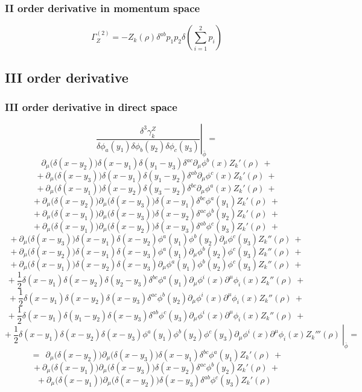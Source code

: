 \subsubsection{II order derivative in momentum space}
\begin{equation}\label{Z2}
 \Gamma_Z^{(2)} = - Z_k(\rho)\delta^{ab}p_1p_2  \delta\left(\sum_{i=1}^2 p_i\right)
\end{equation}


\subsection{III order derivative}
\subsubsection{III order derivative in direct space}
\begin{equation}
\left. \frac{\delta^3 \gamma_k^{Z}}{\delta \phi_a(y_1)\delta \phi_b(y_2)\delta \phi_c(y_3)}\right|_{\bar{\phi}} = 
\end{equation}
$$\partial_\mu\big(\delta(x-y_2)\big)\delta(x-y_1)\delta(y_1 - y_3)\delta^{ac}\partial_\mu\phi^b(x)Z_k'(\rho)\ + $$
$$+\ \partial_\mu\big(\delta(x-y_3)\big)\delta(x-y_1)\delta(y_1 - y_2)\delta^{ab}\partial_\mu\phi^c(x)Z_k'(\rho)\ + $$
$$+\ \partial_\mu\big(\delta(x-y_1)\big)\delta(x-y_2)\delta(y_3 - y_2)\delta^{bc}\partial_\mu\phi^a(x)Z_k'(\rho)\ + $$
$$+\ \partial_\mu\big(\delta(x-y_2)\big)\partial_\mu\big(\delta(x-y_3)\big)\delta(x - y_1)\delta^{bc}\phi^a(y_1)Z_k'(\rho)\ + $$
$$+\ \partial_\mu\big(\delta(x-y_1)\big)\partial_\mu\big(\delta(x-y_3)\big)\delta(x - y_2)\delta^{ac}\phi^b(y_2)Z_k'(\rho)\ + $$
$$+\ \partial_\mu\big(\delta(x-y_1)\big)\partial_\mu\big(\delta(x-y_2)\big)\delta(x - y_3)\delta^{ab}\phi^c(y_3)Z_k'(\rho)\ + $$
$$+\ \partial_\mu\big(\delta(x-y_3)\big)\delta(x-y_1)\delta(x - y_2)\phi^a(y_1)\phi^b(y_2)\partial_\mu\phi^c(y_3)Z_k''(\rho)\ + $$
$$+\ \partial_\mu\big(\delta(x-y_2)\big)\delta(x-y_1)\delta(x - y_3)\phi^a(y_1)\partial_\mu\phi^b(y_2)\phi^c(y_3)Z_k''(\rho)\ + $$
$$+\ \partial_\mu\big(\delta(x-y_1)\big)\delta(x-y_2)\delta(x - y_3)\partial_\mu\phi^a(y_1)\phi^b(y_2)\phi^c(y_3)Z_k''(\rho)\ + $$
$$+\ \frac{1}{2}\delta(x-y_1)\delta(x-y_2)\delta(y_2 - y_3)\delta^{bc}\phi^a(y_1)\partial_\mu\phi^i(x)\partial^\mu\phi_i(x)Z_k''(\rho)\ + $$
$$+\ \frac{1}{2}\delta(x-y_1)\delta(x-y_2)\delta(x - y_3)\delta^{ac}\phi^b(y_2)\partial_\mu\phi^i(x)\partial^\mu\phi_i(x)Z_k''(\rho)\ + $$
$$+\ \frac{1}{2}\delta(x-y_1)\delta(y_1-y_2)\delta(x - y_3)\delta^{ab}\phi^c(y_3)\partial_\mu\phi^i(x)\partial^\mu\phi_i(x)Z_k''(\rho)\ + $$
$$+\left.\ \frac{1}{2}\delta(x-y_1)\delta(x-y_2)\delta(x - y_3)\phi^a(y_1)\phi^b(y_2)\phi^c(y_3)\partial_\mu\phi^i(x)\partial^\mu\phi_i(x)Z_k'''(\rho)\ \right|_{\bar{\phi}}= $$
$$= \ \ \partial_\mu\big(\delta(x-y_2)\big)\partial_\mu\big(\delta(x-y_3)\big)\delta(x - y_1)\delta^{bc}\phi^a(y_1)Z_k'(\rho)\ + $$
$$+\ \partial_\mu\big(\delta(x-y_1)\big)\partial_\mu\big(\delta(x-y_3)\big)\delta(x - y_2)\delta^{ac}\phi^b(y_2)Z_k'(\rho)\ + $$
$$+\ \partial_\mu\big(\delta(x-y_1)\big)\partial_\mu\big(\delta(x-y_2)\big)\delta(x - y_3)\delta^{ab}\phi^c(y_3)Z_k'(\rho)\ \ $$

